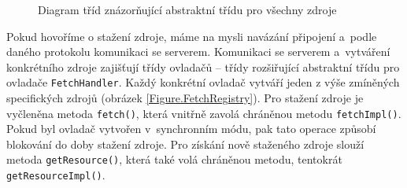 \begin{figure}[H]
  \begin{center}
    \caption{Diagram tříd znázorňující abstraktní třídu pro všechny zdroje}
    \label{Figure.Resource}
  \end{center}
\end{figure}

Pokud hovoříme o stažení zdroje, máme na mysli navázání připojení a~podle daného protokolu komunikaci se serverem. Komunikaci se serverem a~vytváření konkrétního zdroje zajišťují třídy ovladačů -- třídy rozšiřující abstraktní třídu pro ovladače \texttt{FetchHandler}. Každý konkrétní ovladač vytváří jeden z výše zmíněných specifických zdrojů (obrázek \ref{Figure.FetchRegistry}). Pro stažení zdroje je vyčleněna metoda \texttt{fetch()}, která vnitřně zavolá chráněnou metodu \texttt{fetchImpl()}. Pokud byl ovladač vytvořen v~synchronním módu, pak tato operace způsobí blokování do doby stažení zdroje. Pro získání nově staženého zdroje slouží metoda \texttt{getResource()}, která také volá chráněnou metodu, tentokrát \texttt{getResourceImpl()}. 

